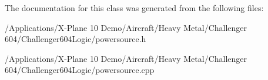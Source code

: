The documentation for this class was generated from the following files\-:\begin{DoxyCompactItemize}
\item 
/\-Applications/\-X-\/\-Plane 10 Demo/\-Aircraft/\-Heavy Metal/\-Challenger 604/\-Challenger604\-Logic/powersource.\-h\item 
/\-Applications/\-X-\/\-Plane 10 Demo/\-Aircraft/\-Heavy Metal/\-Challenger 604/\-Challenger604\-Logic/powersource.\-cpp\end{DoxyCompactItemize}
